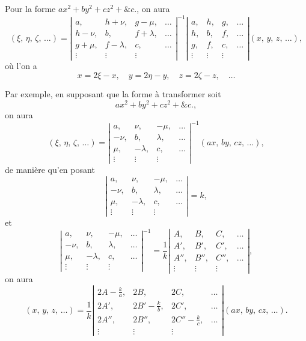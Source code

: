 \documentclass[11pt,a4paper]{book}
\begin{document}
Pour la forme $ax^2 + by^2 + cz^2 + \&c.$, on aura
\[
(\xi,\, \eta,\, \zeta,\, \ldots) =
\left|
\begin{array}{cccc}
a, & h+\nu, & g-\mu, & \ldots \\
h-\nu, & b, & f+\lambda, & \ldots \\
g+\mu, & f-\lambda, & c, & \ldots \\
\vdots & \vdots & \vdots &
\end{array}
\right|^{-1}
\left|
\begin{array}{cccc}
a, & h, & g, & \ldots \\
h, & b, & f, & \ldots \\
g, & f, & c, & \ldots \\
\vdots & \vdots & \vdots &
\end{array}
\right|
(x,\, y,\, z,\, \ldots),
\]
o\`u l'on a
\[
x = 2\xi - x,\quad y = 2\eta - y,\quad z = 2\zeta - z,\quad \ldots
\]

Par exemple, en supposant que la forme \`a transformer soit
\[
ax^2 + by^2 + cz^2 + \&c.,
\]
on aura
\[
(\xi,\, \eta,\, \zeta,\, \ldots) =
\left|
\begin{array}{cccc}
a, & \nu, & -\mu, & \ldots \\
-\nu, & b, & \lambda, & \ldots \\
\mu, & -\lambda, & c, & \ldots \\
\vdots & \vdots & \vdots &
\end{array}
\right|^{-1}
(ax,\, by,\, cz,\, \ldots),
\]
de mani\`ere qu'en posant
\[
\left|
\begin{array}{cccc}
a, & \nu, & -\mu, & \ldots \\
-\nu, & b, & \lambda, & \ldots \\
\mu, & -\lambda, & c, & \ldots \\
\vdots & \vdots & \vdots &
\end{array}
\right| = k,
\]
et
\[
\left|
\begin{array}{cccc}
a, & \nu, & -\mu, & \ldots \\
-\nu, & b, & \lambda, & \ldots \\
\mu, & -\lambda, & c, & \ldots \\
\vdots & \vdots & \vdots &
\end{array}
\right|^{-1}
= \frac{1}{k}
\left|
\begin{array}{cccc}
A, & B, & C, & \ldots \\
A', & B', & C', & \ldots \\
A'', & B'', & C'', & \ldots \\
\vdots & \vdots & \vdots &
\end{array}
\right|,
\]
on aura
\[
(x,\, y,\, z,\, \ldots) = \frac{1}{k}
\left|
\begin{array}{cccc}
2A-\tfrac{k}{a}, & 2B, & 2C, & \ldots \\
2A', & 2B'-\tfrac{k}{b}, & 2C', & \ldots \\
2A'', & 2B'', & 2C''-\tfrac{k}{c}, & \ldots \\
\vdots & \vdots & \vdots &
\end{array}
\right|
(ax,\, by,\, cz,\, \ldots).
\]
\end{document}
